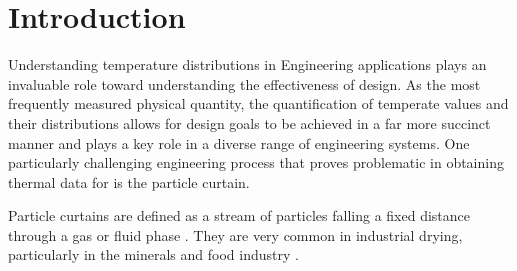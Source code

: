 \documentclass[12pt]{article}
\newcommand{\ts}{\textsuperscript}
\newcommand{\pe}{\vspace{0.3cm}}
\newcommand{\mycite}[1]{\ts{\cite{#1}}}
\begin{document}
\section{Introduction}

Understanding temperature distributions in Engineering applications plays an invaluable role toward understanding the effectiveness of design. 
As the most frequently measured physical quantity, the quantification of temperate values and their distributions allows for design goals to be achieved in a far more succinct manner and plays a key role in a diverse range of engineering systems. One particularly challenging engineering process that proves problematic in obtaining thermal data for is the particle curtain. \\

\pe 


Particle curtains are defined as a stream of particles falling a fixed distance through a gas or fluid phase \mycite{AfsharCurtainPhd}. They are very common in industrial drying, particularly in the minerals and food industry \mycite{AfsharCurtainPhd}.


\begin{comment}
Particle curtains are defined as a continuous stream of particles made to fall in a curtain-like
shape through a gaseous medium. They are employed in a wide variety of industries as heat
exchangers for particulate mediums, due primarily to their simplicity and low operational costs \ts{\cite{AfsharCurtainPhd, AndrewLeePhd}}. Examples include the flighted rotary dryer (FRD) and the hopper, which are common in mineral and pharmaceutical industries. However, particle curtains are steadily emerging in promising new renewable energy technologies for use in concentrating solar power (CSP) plants. These solar particle receiver designs are currently in the early demonstration phase, delivering improved thermal efficiency through their direct storage of heat within sand-like particles \ts{\cite{christian2015system, viebahn2011potential}}.
\end{comment}


\end{document}
